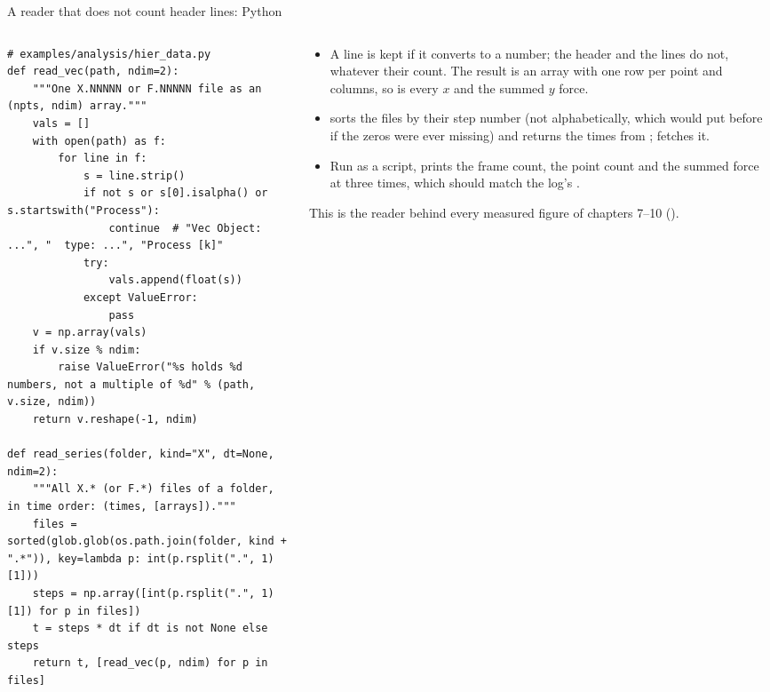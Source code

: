 \documentclass[aspectratio=169,11pt]{beamer}
\begin{document}
\begin{frame}[fragile]{A reader that does not count header lines: Python}
\label{fr:pyreader}
\begin{columns}[T,onlytextwidth]
\begin{column}{0.56\textwidth}
\begin{lstlisting}[style=pythontiny]
# examples/analysis/hier_data.py
def read_vec(path, ndim=2):
    """One X.NNNNN or F.NNNNN file as an (npts, ndim) array."""
    vals = []
    with open(path) as f:
        for line in f:
            s = line.strip()
            if not s or s[0].isalpha() or s.startswith("Process"):
                continue  # "Vec Object: ...", "  type: ...", "Process [k]"
            try:
                vals.append(float(s))
            except ValueError:
                pass
    v = np.array(vals)
    if v.size % ndim:
        raise ValueError("%s holds %d numbers, not a multiple of %d" % (path, v.size, ndim))
    return v.reshape(-1, ndim)

def read_series(folder, kind="X", dt=None, ndim=2):
    """All X.* (or F.*) files of a folder, in time order: (times, [arrays])."""
    files = sorted(glob.glob(os.path.join(folder, kind + ".*")), key=lambda p: int(p.rsplit(".", 1)[1]))
    steps = np.array([int(p.rsplit(".", 1)[1]) for p in files])
    t = steps * dt if dt is not None else steps
    return t, [read_vec(p, ndim) for p in files]
\end{lstlisting}
\end{column}
\begin{column}{0.42\textwidth}
\scriptsize
\begin{itemize}
  \item A line is kept if it converts to a number; the header and the  lines do not, whatever their count. The result is an array with one row per point and  columns, so  is every $x$ and  the summed $y$ force.
  \item {} sorts the files by their step number (not alphabetically, which would put  before  if the zeros were ever missing) and returns the times from ;  fetches it.
  \item Run as a script,  prints the frame count, the point count and the summed force at three times, which should match the log's .
\end{itemize}
\scriptsize This is the reader behind every measured figure of chapters 7--10 ().
\end{column}
\end{columns}
\end{frame}
\end{document}
